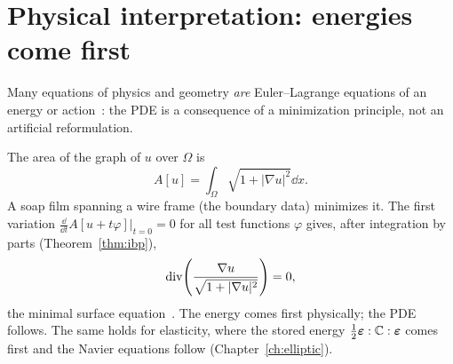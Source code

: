 \section{Physical interpretation: energies come first}\label{sec:var-phys}
%
Many equations of physics and geometry \emph{are} Euler--Lagrange equations of
an energy or action~\cite{GilbargTrudinger2001}: the PDE is a consequence of a
minimization principle, not an artificial reformulation.
\begin{center}
\end{center}
The area of the graph of $u$ over $\Omega$ is
\[
  A[u]=\int_\Omega\sqrt{1+|\nabla u|^2}\dd x .
\]
A soap film spanning a wire frame (the boundary data) minimizes it. The first
variation $\displaystyle \frac{\dd}{\dd t}A[u+t\varphi]\big|_{t=0}=0$ for all test functions
$\varphi$ gives, after integration by parts (Theorem~\ref{thm:ibp}),
\[
  \operatorname{div}\!\left(\frac{\nabla u}{\sqrt{1+|\nabla u|^2}}\right)=0,
\]
the minimal surface equation~\cite{Courant1950}. The energy comes first
physically; the PDE follows. The same holds for elasticity, where the stored
energy $\tfrac12\bm{\varepsilon}:\mathbb{C}:\bm{\varepsilon}$ comes first and the Navier equations follow
(Chapter~\ref{ch:elliptic}).

